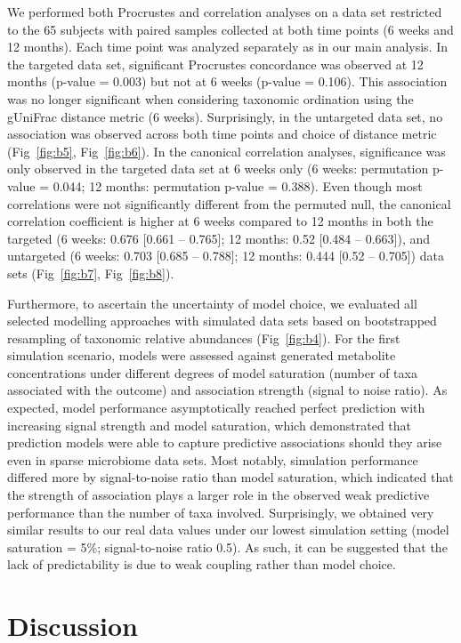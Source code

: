 We performed both Procrustes and correlation analyses on a data set restricted to the 65 subjects with paired samples collected at both time points (6 weeks and 12 months). Each time point was analyzed separately as in our main analysis. In the targeted data set, significant Procrustes concordance was observed at 12 months (p-value = 0.003) but not at 6 weeks (p-value = 0.106). This association was no longer significant when considering taxonomic ordination using the gUniFrac distance metric (6 weeks). Surprisingly, in the untargeted data set, no association was observed across both time points and choice of distance metric (Fig~\ref{fig:b5}, Fig~\ref{fig:b6}). In the canonical correlation analyses, significance was only observed in the targeted data set at 6 weeks only (6 weeks: permutation p-value = 0.044; 12 months: permutation p-value = 0.388). Even though most correlations were not significantly different from the permuted null, the canonical correlation coefficient is higher at 6 weeks compared to 12 months in both the targeted (6 weeks: 0.676 [0.661 -- 0.765]; 12 months: 0.52 [0.484 -- 0.663]), and untargeted (6 weeks: 0.703 [0.685 -- 0.788]; 12 months: 0.444 [0.52 -- 0.705]) data sets (Fig~\ref{fig:b7}, Fig~\ref{fig:b8}). 

Furthermore, to ascertain the uncertainty of model choice, we evaluated all selected modelling approaches with simulated data sets based on bootstrapped resampling of taxonomic relative abundances (Fig~\ref{fig:b4}). For the first simulation scenario, models were assessed against generated metabolite concentrations under different degrees of model saturation (number of taxa associated with the outcome) and association strength (signal to noise ratio). As expected, model performance asymptotically reached perfect prediction with increasing signal strength and model saturation, which demonstrated that prediction models were able to capture predictive associations should they arise even in sparse microbiome data sets. Most notably, simulation performance differed more by signal-to-noise ratio than model saturation, which indicated that the strength of association plays a larger role in the observed weak predictive performance than the number of taxa involved. Surprisingly, we obtained very similar results to our real data values under our lowest simulation setting (model saturation = 5\%; signal-to-noise ratio 0.5). As such, it can be suggested that the lack of predictability is due to weak coupling rather than model choice. 

\section{Discussion}


